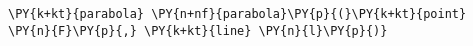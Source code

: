 \begin{Verbatim}[commandchars=\\\{\}]
    \PY{k+kt}{parabola} \PY{n+nf}{parabola}\PY{p}{(}\PY{k+kt}{point} \PY{n}{F}\PY{p}{,} \PY{k+kt}{line} \PY{n}{l}\PY{p}{)}
\end{Verbatim}
